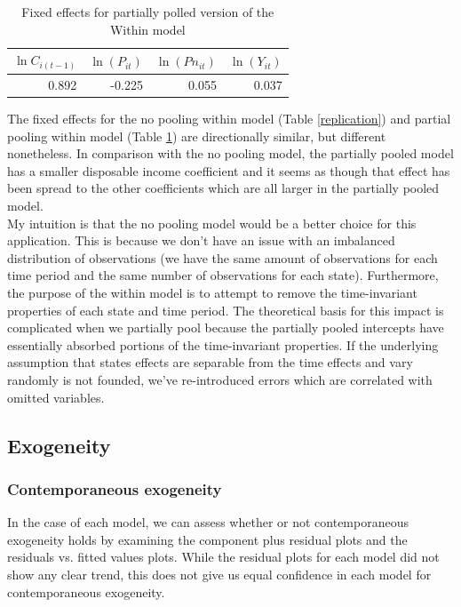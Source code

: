 \documentclass{article}
\begin{document}
\begin{table}[H]
\centering
\caption{Fixed effects for partially polled version of the Within model}
\label{fixed}
\begin{tabular}{@{}  r r r r @{}}
 $\ln C_{i(t-1)}$ & $\ln(P_{it})$ & $\ln(Pn_{it})$ & $\ln(Y_{it})$  \\\midrule
 0.892 &  -0.225 & 0.055 &  0.037\\
\bottomrule
\hline
\end{tabular}
\end{table}

The fixed effects for the no pooling within model (Table \ref{replication}) and partial pooling within model (Table \ref{fixed}) are directionally similar, but different nonetheless. In comparison with the no pooling model, the partially pooled model has a smaller disposable income coefficient and it seems as though that effect has been spread to the other coefficients which are all larger in the partially pooled model. \\

My intuition is that the no pooling model would be a better choice for this application. This is because we don't have an issue with an imbalanced distribution of observations (we have the same amount of observations for each time period and the same number of observations for each state). Furthermore, the purpose of the within model is to attempt to remove the time-invariant properties of each state and time period. The theoretical basis for this impact is complicated when we partially pool because the partially pooled intercepts have essentially absorbed portions of the time-invariant properties. If the underlying assumption that states effects are separable from the time effects and vary randomly is not founded, we've re-introduced errors which are correlated with omitted variables.

\subsection{Exogeneity}
\subsubsection{Contemporaneous exogeneity}
In the case of each model, we can assess whether or not contemporaneous exogeneity holds by examining the component plus residual plots and the residuals vs. fitted values plots. While the residual plots for each model did not show any clear trend, this does not give us equal confidence in each model for contemporaneous exogeneity.\\
\end{document}
